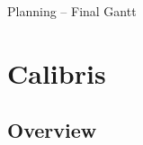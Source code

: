 \documentclass[10pt,a4paper]{beamer}
\begin{document}
\begin{frame}{Planning -- Final Gantt}

\begin{landscape}
\begin{figure}[htp] 
\end{figure}
\end{landscape}

\end{frame}

\section{Calibris}
\subsection{Overview}
\end{document}

